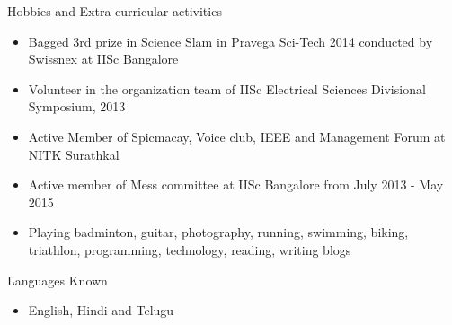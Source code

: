 \documentclass[10pt]{article}
\begin{document}
\begin{cv}
\begin{cvlist}{Hobbies and Extra-curricular activities}
\begin{itemize}
\item Bagged 3rd prize in Science Slam in Pravega Sci-Tech 2014 conducted by Swissnex at IISc Bangalore

\item Volunteer in the organization team of IISc Electrical Sciences Divisional Symposium, 2013
\item


Active Member of  Spicmacay, Voice club, IEEE and Management Forum
 at NITK Surathkal
 \item Active member of Mess committee at IISc Bangalore from July 2013 - May 2015
\item

Playing badminton, guitar,  photography,  running, swimming, biking, triathlon,  programming, technology, reading, writing blogs


	\end{itemize}

\end{cvlist}


\begin{cvlist}{Languages Known}
\item
\begin{itemize}\itemsep=0.25em
	\item English, Hindi and Telugu
	\end{itemize}

\end{cvlist}




\setlength{\cvlabelwidth}{\oldcvlabelwidth}
\setlength{\cvlabelsep}{\oldcvlabelsep}

\end{cv}
\end{document}
